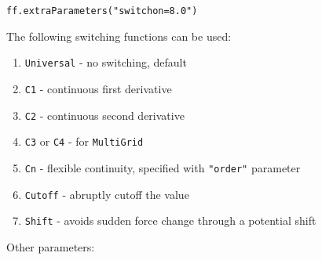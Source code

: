 \documentclass[11pt]{report}
\begin{document}
\begin{verbatim}
ff.extraParameters("switchon=8.0")
\end{verbatim}

The following switching functions can be used:

\begin{enumerate}
\item \texttt{Universal} - no switching, default
\item \texttt{C1} - continuous first derivative
\item \texttt{C2} - continuous second derivative
\item \texttt{C3} or \texttt{C4} - for \texttt{MultiGrid}
\item \texttt{Cn} - flexible continuity, specified with \texttt{"order"} parameter
\item \texttt{Cutoff} - abruptly cutoff the value
\item \texttt{Shift} - avoids sudden force change through a potential shift
\end{enumerate}

Other parameters:
\end{document}
